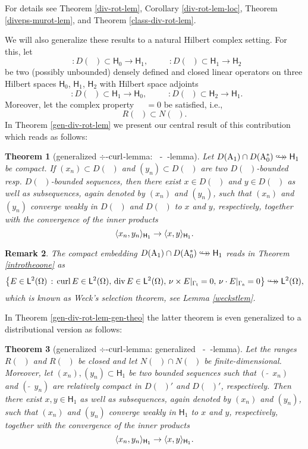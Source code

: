 \documentclass[a4paper]{amsart}
\renewcommand{\H}{\mathsf{H}}
\DeclareMathOperator{\Az}{A_{0}}
\DeclareMathOperator{\Azs}{A_{0}^{*}}
\DeclareMathOperator{\Ao}{A_{1}}
\DeclareMathOperator{\Aos}{A_{1}^{*}}
\newcommand{\cptemb}{\hookto\hspace*{-0.85em}\hookto}
\newtheorem{theorom}{Theorem}
\newtheorem{remrom}[theorom]{Remark}
\begin{document}
For details see Theorem \ref{div-rot-lem}, Corollary \ref{div-rot-lem-loc},
Theorem \ref{diveps-murot-lem}, and Theorem \ref{class-div-rot-lem}.

We will also generalize these results to a natural Hilbert complex setting. For this, let 
$$\Az\!:\!D(\Az)\subset\H_{0}\to\H_{1},\qquad
\Ao\!:\!D(\Ao)\subset\H_{1}\to\H_{2}$$
be two (possibly unbounded) densely defined and closed linear operators 
on three Hilbert spaces $\H_{0}$, $\H_{1}$, $\H_{2}$ with Hilbert space adjoints 
$$\Azs\!:\!D(\Azs)\subset\H_{1}\to\H_{0},\qquad
\Aos\!:\!D(\Aos)\subset\H_{2}\to\H_{1}.$$
Moreover, let the complex property $\Ao\Az=0$ be satisfied, i.e.,
$$R(\Az)\subset N(\Ao).$$
In Theorem \ref{gen-div-rot-lem}
we present our central result of this contribution which reads as follows:

\begin{theorom}[generalized $\div$-$\operatorname{curl}$-lemma: $\Azs$-$\Ao$-lemma]
Let $D(\Ao)\cap D(\Azs)\cptemb\H_{1}$ be compact.
If $(x_{n})\subset D(\Ao)$ and $(y_{n})\subset D(\Azs)$ 
are two $D(\Ao)$-bounded resp. $D(\Azs)$-bounded sequences, 
then there exist $x\in D(\Ao)$ and $y\in D(\Azs)$ as well as subsequences, 
again denoted by $(x_{n})$ and $(y_{n})$, 
such that $(x_{n})$ and $(y_{n})$ converge weakly in $D(\Ao)$ and $D(\Azs)$ to $x$ and $y$, respectively, 
together with the convergence of the inner products
$$\scp{x_{n}}{y_{n}}_{\H_{1}}\to\scp{x}{y}_{\H_{1}}.$$
\end{theorom}

\begin{remrom}
The compact embedding $D(\Ao)\cap D(\Azs)\cptemb\H_{1}$ reads in Theorem \ref{introtheoone} as
$$\setb{E\in\ltom}{\curl E\in\ltom,\,\div E\in\ltom,\,\nu\times E|_{\gat}=0,\,\nu\cdot E|_{\gan}=0}\cptemb\ltom,$$
which is known as Weck's selection theorem, see Lemma \ref{weckstlem}.
\end{remrom}

In  Theorem \ref{gen-div-rot-lem-gen-theo} the latter theorem 
is even generalized to a distributional version as follows:

\begin{theorom}[generalized $\div$-$\operatorname{curl}$-lemma: generalized $\Azs$-$\Ao$-lemma]
Let the ranges $R(\Az)$ and $R(\Ao)$ be closed and let $N(\Ao)\cap N(\Azs)$ be finite-dimensional.
Moreover, let $(x_{n}),(y_{n})\subset\H_{1}$ be two bounded sequences such that
$(\widetilde{\Ao}\,x_{n})$ and $(\widetilde{\Azs}\,y_{n})$ 
are relatively compact in $D(\Aos)'$ and $D(\Az)'$, respectively.
Then there exist $x,y\in\H_{1}$ as well as subsequences, again denoted by $(x_{n})$ and $(y_{n})$, 
such that $(x_{n})$ and $(y_{n})$ converge weakly in $\H_{1}$ to $x$ and $y$, respectively, 
together with the convergence of the inner products
$$\scp{x_{n}}{y_{n}}_{\H_{1}}\to\scp{x}{y}_{\H_{1}}.$$
\end{theorom}
\end{document}
